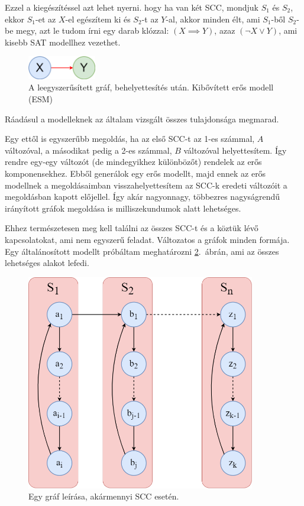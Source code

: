 \documentclass[
]{thesis-ekf}
\theoremstyle{definition}
\theoremstyle{remark}
\begin{document}
	Ezzel a kiegészítéssel azt lehet nyerni. hogy ha van két \textsc{SCC}, mondjuk $ S_1 $ és $ S_2 $, ekkor $ S_1 $-et az $ X $-el egészítem ki és $ S_2 $-t az $ Y $-al, akkor minden élt, ami $ S_1 $-ből $ S_2 $-be megy, azt le tudom írni egy darab klózzal: $ (X\implies Y) $, azaz $ (\neg X\vee Y) $, ami kisebb \textsc{SAT} modellhez vezethet.
	
	\begin{figure}[!ht]
		\centering
		\includegraphics[width=3cm]{images/sajat_pelda_5_9_to_esm}
		\caption{A leegyszerűsített gráf, behelyettesítés után. Kibővített erős modell (\textsc{ESM})}
		\label{abra-sajatpelda-59to-esm}
	\end{figure}

	Ráadásul a modelleknek az általam vizsgált összes tulajdonsága megmarad.
	
	Egy ettől is egyszerűbb megoldás, ha az első \textsc{SCC}-t az 1-es számmal, $ A $ változóval, a másodikat pedig a 2-es számmal, $B$ változóval helyettesítem. Így rendre egy-egy változót (de mindegyikhez különbözőt) rendelek az erős komponensekhez. Ebből generálok egy erős modellt, majd ennek az erős modellnek a megoldásaimban visszahelyettesítem az \textsc{SCC}-k eredeti változóit a megoldásban kapott előjellel. Így akár nagyonnagy, többezres nagyságrendű irányított gráfok megoldása is milliszekundumok alatt lehetséges.
	\newpage
	
	Ehhez természetesen meg kell találni az összes \textsc{SCC}-t és a köztük lévő kapcsolatokat, ami nem egyszerű feladat. Változatos a gráfok minden formája. Egy általánosított modellt próbáltam meghatározni \ref{abra-sajatpelda-altalanos}.~ábrán, ami az összes lehetséges alakot lefedi.
	
	\begin{figure}[!ht]
		\centering
		\includegraphics[width=10cm]{images/sajat_pelda-altalanos}
		\caption{Egy gráf leírása, akármennyi \textsc{SCC} esetén.}
		\label{abra-sajatpelda-altalanos}
	\end{figure}
\end{document}
